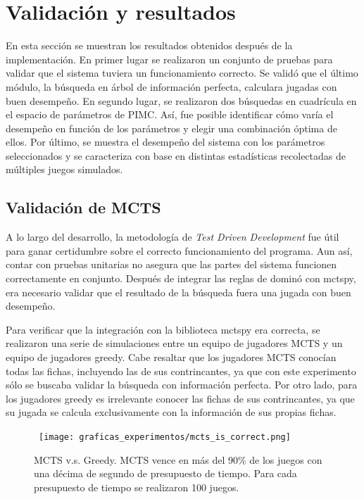 \chapter{Validación y resultados}

\noindent
En esta sección se muestran los resultados obtenidos después de la
implementación. En primer lugar se realizaron un conjunto de pruebas para
validar que el sistema tuviera un funcionamiento correcto. Se validó que el
último módulo, la búsqueda en árbol de información perfecta, calculara jugadas
con buen desempeño. En segundo lugar, se realizaron dos búsquedas en cuadrícula
en el espacio de parámetros de PIMC. Así, fue posible identificar cómo varía el
desempeño en función de los parámetros y elegir una combinación óptima de ellos.
Por último, se muestra el desempeño del sistema con los parámetros seleccionados
y se caracteriza con base en distintas estadísticas recolectadas de múltiples
juegos simulados.

\section{Validación de MCTS}

A lo largo del desarrollo, la metodología de  \textit{Test Driven Development}
fue útil para ganar certidumbre sobre el correcto funcionamiento del programa.
Aun así, contar con pruebas unitarias no asegura que las partes del sistema
funcionen correctamente en conjunto. Después de integrar las reglas de dominó
con mctspy, era necesario validar que el resultado de la búsqueda fuera una jugada
con buen desempeño.

Para verificar que la integración con la biblioteca mctspy era correcta, se
realizaron una serie de simulaciones entre un equipo de jugadores MCTS y un
equipo de jugadores greedy. Cabe resaltar que los jugadores MCTS conocían todas
las fichas, incluyendo las de sus contrincantes, ya que con este experimento
sólo se buscaba validar la búsqueda con información perfecta. Por otro lado,
para los jugadores greedy es irrelevante conocer las fichas de sus
contrincantes, ya que su jugada se calcula exclusivamente con la información de
sus propias fichas.

\begin{figure}[ht]
    \begin{center}
        \hbox{\hspace{-2em}
        \texttt{[image: graficas\_experimentos/mcts\_is\_correct.png]}}
        \caption{MCTS v.s. Greedy. MCTS vence en más del 90\% de los juegos con
        una décima de segundo de presupuesto de tiempo. Para cada presupuesto de
        tiempo se realizaron 100 juegos.}
        \label{MGA}
    \end{center}
\end{figure}

